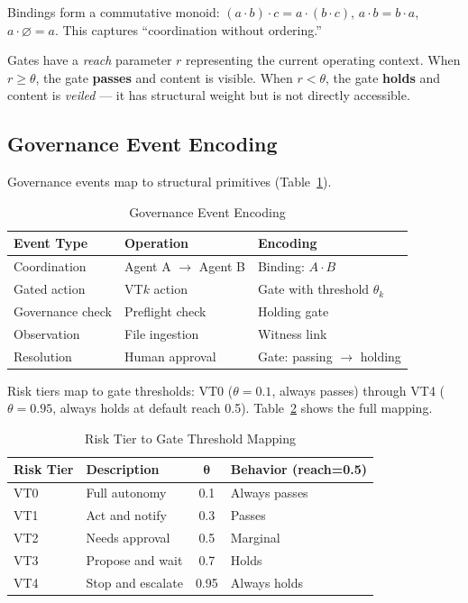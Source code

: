 \documentclass[sigconf,nonacm]{acmart}
\begin{document}
Bindings form a commutative monoid:
$(a \cdot b) \cdot c = a \cdot (b \cdot c)$,
$a \cdot b = b \cdot a$,
$a \cdot \varnothing = a$.
This captures ``coordination without ordering.''

Gates have a \emph{reach} parameter $r$ representing the current
operating context. When $r \geq \theta$, the gate \textbf{passes} and
content is visible. When $r < \theta$, the gate \textbf{holds} and
content is \emph{veiled} --- it has structural weight but is not directly
accessible.


\subsection{Governance Event Encoding}\label{sec:encoding}

Governance events map to structural primitives
(Table~\ref{tab:events}).

\begin{table}[t]
  \caption{Governance Event Encoding}\label{tab:events}
  \small
  \begin{tabular}{@{}lll@{}}
    \toprule
    \textbf{Event Type} & \textbf{Operation} & \textbf{Encoding} \\
    \midrule
    Coordination & Agent A $\to$ Agent B & Binding: $A \cdot B$ \\
    Gated action & VT$k$ action & Gate with threshold $\theta_k$ \\
    Governance check & Preflight check & Holding gate \\
    Observation & File ingestion & Witness link \\
    Resolution & Human approval & Gate: passing $\to$ holding \\
    \bottomrule
  \end{tabular}
\end{table}

Risk tiers map to gate thresholds: VT0 ($\theta{=}0.1$, always passes)
through VT4 ($\theta{=}0.95$, always holds at default reach 0.5).
Table~\ref{tab:risktiers} shows the full mapping.

\begin{table}[t]
  \caption{Risk Tier to Gate Threshold Mapping}\label{tab:risktiers}
  \small
  \begin{tabular}{@{}llcl@{}}
    \toprule
    \textbf{Risk Tier} & \textbf{Description} & $\boldsymbol{\theta}$ & \textbf{Behavior (reach=0.5)} \\
    \midrule
    VT0 & Full autonomy & 0.1 & Always passes \\
    VT1 & Act and notify & 0.3 & Passes \\
    VT2 & Needs approval & 0.5 & Marginal \\
    VT3 & Propose and wait & 0.7 & Holds \\
    VT4 & Stop and escalate & 0.95 & Always holds \\
    \bottomrule
  \end{tabular}
\end{table}
\end{document}
